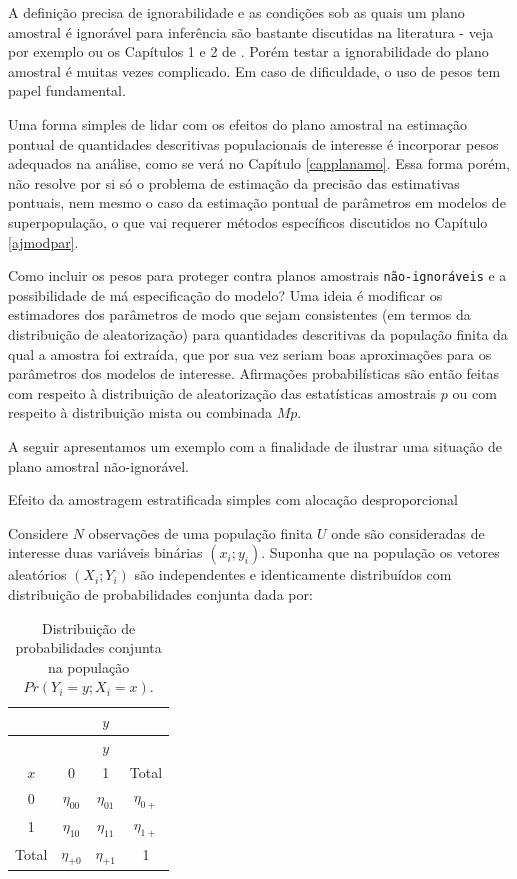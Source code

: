 \documentclass[]{book}
\theoremstyle{definition}
\theoremstyle{definition}
\theoremstyle{definition}
\theoremstyle{remark}
\let\BeginKnitrBlock\begin \let\EndKnitrBlock\end
\begin{document}
A definição precisa de ignorabilidade e as condições sob as quais um
plano amostral é ignorável para inferência são bastante discutidas na
literatura - veja por exemplo \citep{Sugden84} ou os Capítulos 1 e 2 de
\citep{CHSK2003}. Porém testar a ignorabilidade do plano amostral é
muitas vezes complicado. Em caso de dificuldade, o uso de pesos tem
papel fundamental.

Uma forma simples de lidar com os efeitos do plano amostral na estimação
pontual de quantidades descritivas populacionais de interesse é
incorporar pesos adequados na análise, como se verá no Capítulo
\ref{capplanamo}. Essa forma porém, não resolve por si só o problema de
estimação da precisão das estimativas pontuais, nem mesmo o caso da
estimação pontual de parâmetros em modelos de superpopulação, o que vai
requerer métodos específicos discutidos no Capítulo \ref{ajmodpar}.

Como incluir os pesos para proteger contra planos amostrais
\texttt{não-ignoráveis} e a possibilidade de má especificação do modelo?
Uma ideia é modificar os estimadores dos parâmetros de modo que sejam
consistentes (em termos da distribuição de aleatorização) para
quantidades descritivas da população finita da qual a amostra foi
extraída, que por sua vez seriam boas aproximações para os parâmetros
dos modelos de interesse. Afirmações probabilísticas são então feitas
com respeito à distribuição de aleatorização das estatísticas amostrais
\(p\) ou com respeito à distribuição mista ou combinada \(Mp\).

A seguir apresentamos um exemplo com a finalidade de ilustrar uma
situação de plano amostral não-ignorável.

\BeginKnitrBlock{example}
\protect\hypertarget{exm:nonigno}{}{\label{exm:nonigno} }Efeito da
amostragem estratificada simples com alocação desproporcional
\EndKnitrBlock{example}

Considere \(N\) observações de uma população finita \(U\) onde são
consideradas de interesse duas variáveis binárias \((x_i ; y_i )\).
Suponha que na população os vetores aleatórios \((X_i ; Y_i )\) são
independentes e identicamente distribuídos com distribuição de
probabilidades conjunta dada por:

\begin{longtable}[]{@{}cccc@{}}
\caption{\label{tab:Tab24} Distribuição de probabilidades conjunta na
população \(Pr( Y_i = y ; X_i = x )\).}\tabularnewline
\toprule
& & \(y\) &\tabularnewline
\midrule
\endfirsthead
\toprule
& & \(y\) &\tabularnewline
\midrule
\endhead
\(x\) & 0 & 1 & Total\tabularnewline
0 & \(\eta_{00}\) & \(\eta_{01}\) & \(\eta_{0+}\)\tabularnewline
1 & \(\eta_{10}\) & \(\eta_{11}\) & \(\eta_{1+}\)\tabularnewline
Total & \(\eta_{+0}\) & \(\eta_{+1}\) & 1\tabularnewline
\bottomrule
\end{longtable}
\end{document}
